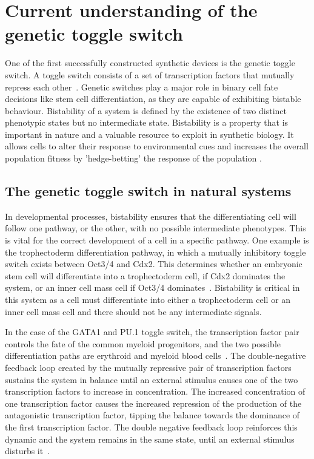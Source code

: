 


\section{Current understanding of the genetic toggle switch}

One of the first successfully constructed synthetic devices is the genetic toggle switch. A toggle switch consists of a set of transcription factors that mutually repress each other~\autocite{Gardner:2000vha}. Genetic switches play a major role in binary cell fate decisions like stem cell differentiation, as they are capable of exhibiting bistable behaviour. Bistability of a system is defined by the existence of two distinct phenotypic states but no intermediate state. Bistability is a property that is important in nature and a valuable resource to exploit in synthetic biology. It allows cells to alter their response to environmental cues and increases the overall population fitness by 'hedge-betting' the response of the population \autocite{Veening:2008da}. 

\subsection{The genetic toggle switch in natural systems}
In developmental processes, bistability ensures that the differentiating cell will follow one pathway, or the other, with no possible intermediate phenotypes. This is vital for the correct development of a cell in a specific pathway. One example is the trophectoderm differentiation pathway, in which a mutually inhibitory toggle switch exists between Oct3/4 and Cdx2. This determines whether an embryonic stem cell will differentiate into a trophectoderm cell, if Cdx2 dominates the system, or an inner cell mass cell if Oct3/4 dominates~\autocite{Niwa:2005fz}. Bistability is critical in this system as a cell must differentiate into either a trophectoderm cell or an inner cell mass cell and there should not be any intermediate signals. 

In the case of the GATA1 and PU.1 toggle switch, the transcription factor pair controls the fate of the common myeloid progenitors, and the two possible differentiation paths are erythroid and myeloid blood cells~\autocite{Chickarmane:2009by}. The double-negative feedback loop created by the mutually repressive pair of transcription factors sustains the system in balance until an external stimulus causes one of the two transcription factors to increase in concentration. The increased concentration of one transcription factor causes the increased repression of the production of the antagonistic transcription factor, tipping the balance towards the dominance of the first transcription factor. The double negative feedback loop reinforces this dynamic and the system remains in the same state, until an external stimulus disturbs it~\autocite{FerrellJr:2002fh}.

